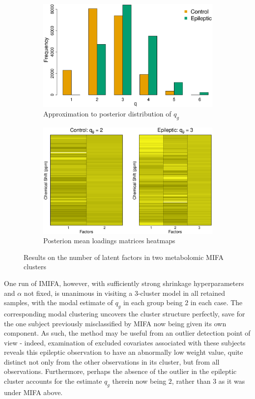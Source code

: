 \documentclass[a4paper,12pt,fleqn]{article}
\numberwithin{equation}{section}
\begin{document}
\begin{figure}[h]
	\centering
	\begin{subfigure}{0.5\textwidth}
		\centering
		\includegraphics[width=\linewidth, keepaspectratio]{Qdist.eps}
		\caption{Approximation to posterior distribution of $q_g$}
		\label{MIFA_Qdist}
	\end{subfigure}%
	\begin{subfigure}{0.5\textwidth}
		\centering
		\includegraphics[width=\linewidth, keepaspectratio]{Loadings_Heatmap.eps}
		\caption{Posterion mean loadings matrices heatmaps}
		\label{MIFA_Loadings}
	\end{subfigure}
		\caption{Results on the number of latent factors in two metabolomic MIFA clusters}
		\label{MIFA_UrineResults}
\end{figure}

One run of IMIFA, however, with sufficiently strong shrinkage hyperparameters and $\alpha$ not fixed, is unanimous in visiting a $3$-cluster model in all retained samples, with the modal estimate of $q_g$ in each group being $2$ in each case. The corresponding modal clustering uncovers the cluster structure perfectly, save for the one subject previously misclassified by MIFA now being given its own component. As such, the method may be useful from an outlier detection point of view - indeed, examination of excluded covariates associated with these subjects reveals this epileptic observation to have an abnormally low weight value, quite distinct not only from the other observations in its cluster, but from all observations. Furthermore, perhaps the absence of the outlier in the epileptic cluster accounts for the estimate $q_g$ therein now being $2$, rather than $3$ as it was under MIFA above.
\end{document}
